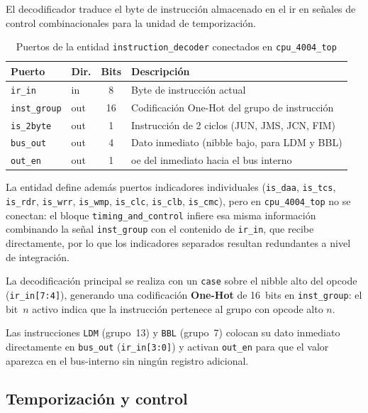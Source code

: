 \documentclass[%
    school=etsisi,%
    type=pfg,%
    degree=61CI,%
]{upm-report}
\newcommand{\vhdlfile}[1]{%
    \par\noindent{\small\sffamily\color{gray}Fichero: \texttt{#1}}\par\smallskip
}
\begin{document}
El decodificador traduce el byte de instrucción almacenado en el \acrshort{ir}
en señales de control combinacionales para la unidad de temporización.

\begin{table}[H]
\centering
\caption{Puertos de la entidad \texttt{instruction\_decoder} conectados en \texttt{cpu\_4004\_top}}
\label{tab:decoder}
\begin{tabularx}{\textwidth}{@{}llcX@{}}
\toprule
\textbf{Puerto}    & \textbf{Dir.} & \textbf{Bits} & \textbf{Descripción} \\
\midrule
\texttt{ir\_in}      & in  & 8  & Byte de instrucción actual \\
\texttt{inst\_group} & out & 16 & Codificación One-Hot del grupo de instrucción \\
\texttt{is\_2byte}   & out & 1  & Instrucción de 2 ciclos (JUN, JMS, JCN, FIM) \\
\texttt{bus\_out}    & out & 4  & Dato inmediato (nibble bajo, para LDM y BBL) \\
\texttt{out\_en}     & out & 1  & \acrshort{oe} del inmediato hacia el bus interno \\
\bottomrule
\end{tabularx}
\end{table}

La entidad define además puertos indicadores individuales (\texttt{is\_daa},
\texttt{is\_tcs}, \texttt{is\_rdr}, \texttt{is\_wrr}, \texttt{is\_wmp},
\texttt{is\_clc}, \texttt{is\_clb}, \texttt{is\_cmc}), pero en
\texttt{cpu\_4004\_top} no se conectan: el bloque
\texttt{timing\_and\_control} infiere esa misma información combinando la
señal \texttt{inst\_group} con el contenido de \texttt{ir\_in}, que recibe
directamente, por lo que los indicadores separados resultan redundantes a
nivel de integración.

La decodificación principal se realiza con un \texttt{case} sobre el nibble
alto del opcode (\texttt{ir\_in[7:4]}), generando una codificación
\textbf{One-Hot} de 16~bits en \texttt{inst\_group}: el bit~$n$ activo
indica que la instrucción pertenece al grupo con opcode alto $n$.

Las instrucciones \texttt{LDM} (grupo~13) y \texttt{BBL} (grupo~7) colocan
su dato inmediato directamente en \texttt{bus\_out} (\texttt{ir\_in[3:0]})
y activan \texttt{out\_en} para que el valor aparezca en el \gls{bus-interno}
sin ningún registro adicional.

\subsection{Temporización y control}
\label{ss:timing-control}
\vhdlfile{timing\_and\_control.vhd}
\end{document}
